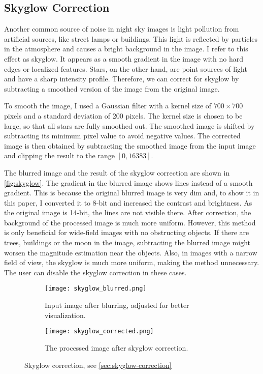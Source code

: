 \subsection{Skyglow Correction}
\label{sec:skyglow-correction}

Another common source of noise in night sky images is light pollution from artificial
sources, like street lamps or buildings. This light is reflected by particles in the
atmosphere and causes a bright background in the image. I refer to this effect as skyglow.
It appears as a smooth gradient in the image with no hard edges or localized features.
Stars, on the other hand, are point sources of light and have a sharp intensity profile.
Therefore, we can correct for skyglow by subtracting a smoothed version of the image from
the original image.

To smooth the image, I used a Gaussian filter with a kernel size of $700 \times 700$
pixels and a standard deviation of 200 pixels. The kernel size is chosen to be large, so
that all stars are fully smoothed out. The smoothed image is shifted by subtracting its
minimum pixel value to avoid negative values. The corrected image is then obtained by
subtracting the smoothed image from the input image and clipping the result to the range
$[0, 16383]$.

The blurred image and the result of the skyglow correction are shown in
\autoref{fig:skyglow}. The gradient in the blurred image shows lines instead of a smooth
gradient. This is because the original blurred image is very dim and, to show it in this
paper, I converted it to 8-bit and increased the contrast and brightness. As the original
image is 14-bit, the lines are not visible there. After correction, the background of the
processed image is much more uniform. However, this method is only beneficial for
wide-field images with no obstructing objects. If there are trees, buildings or the moon
in the image, subtracting the blurred image might worsen the magnitude estimation near the
objects. Also, in images with a narrow field of view, the skyglow is much more uniform,
making the method unnecessary. The user can disable the skyglow correction in these cases.

\begin{figure}[tb]
  \centering
  \begin{subfigure}{.49\textwidth}
    \centering
    \texttt{[image: skyglow\_blurred.png]}
    \caption{Input image after blurring, adjusted for better visualization.}
    \label{fig:skyglow-blurred}
  \end{subfigure}%
  \hfill
  \begin{subfigure}{.49\textwidth}
    \centering
    \texttt{[image: skyglow\_corrected.png]}
    \caption{The processed image after skyglow correction.\\\text{}}
    \label{fig:skyglow-corrected}
  \end{subfigure}
  \caption{Skyglow correction, see \autoref{sec:skyglow-correction}}
  \label{fig:skyglow}
\end{figure}

